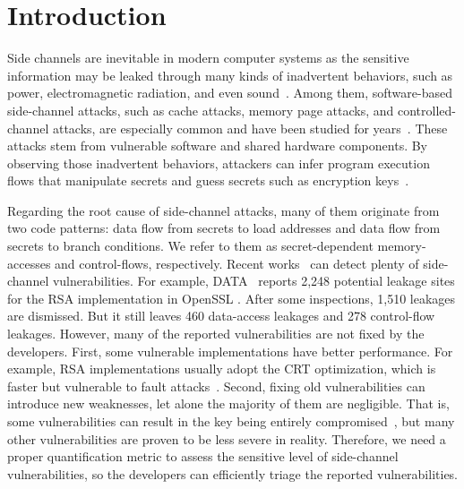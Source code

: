 \section{Introduction} 
Side channels are inevitable in modern computer systems as the sensitive
information may be leaked through many kinds of inadvertent behaviors, such as power,
electromagnetic radiation, and even
sound~\cite{agrawal2002side,kar20178,chari1999towards,217605,genkin2014rsa}.
Among them, software-based side-channel attacks, such as cache attacks, memory page
attacks, and controlled-channel attacks, are especially common and have been
studied for years~\cite{7163052,217543,217589,lee2017inferring,191010,liu2015last}. These
attacks stem from vulnerable software and shared hardware components.
By observing those inadvertent behaviors, attackers can infer program
execution flows that manipulate secrets and guess secrets such as encryption
keys~\cite{Osvik2006,Gullasch:2011:CGB:2006077.2006784,203878,10.1007/978-3-540-45238-6_6}.


Regarding the root cause of side-channel attacks, many of them originate
from two code patterns: data flow from secrets to load
addresses and data flow from secrets to branch conditions. We refer to them as
secret-dependent memory-accesses and control-flows, respectively. 
Recent works~\cite{203878,217537,Wichelmann:2018:MFF:3274694.3274741,Brotzman19Casym,236338,182946}
can detect plenty of side-channel vulnerabilities. For example,
DATA~\cite{217537} reports 2,248 potential leakage sites for the RSA
implementation in OpenSSL \@. 
After some inspections, 1,510 leakages are dismissed. But it
still leaves 460 data-access leakages and 278 control-flow leakages. 
However, many of the reported vulnerabilities are not fixed by the developers.
First, some vulnerable implementations have better performance. For example,
RSA implementations usually adopt the CRT optimization,
which is faster but vulnerable to fault attacks~\cite{aumuller2002fault}.
Second, fixing old vulnerabilities can introduce new 
weaknesses, let alone the majority of them are negligible. 
That is, some vulnerabilities can result in the key being 
entirely compromised~\cite{184415, aumuller2002fault}, 
but many other vulnerabilities are proven to be less
severe in reality. Therefore, we need a proper quantification metric to 
assess the sensitive level of side-channel vulnerabilities,
so the developers can efficiently triage the reported vulnerabilities.

